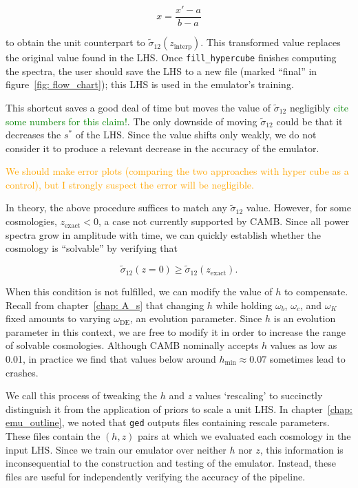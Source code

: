\begin{equation}
x = \frac{x' - a}{b - a}
\end{equation}

to obtain the unit counterpart to $\tilde{\sigma}_{12}(z_\text{interp})$.
This transformed value replaces the original value found in the LHS.
Once \verb|fill_hypercube| finishes computing the spectra, the user
should save the LHS to a new file (marked ``final'' in
figure~\ref{fig: flow_chart}); this LHS is used in the emulator's training.

This shortcut saves a good deal of time but moves the value of
$\tilde{\sigma}_{12}$ negligibly
\textcolor{green}{cite some numbers for this claim!}.
The only downside of moving $\tilde{\sigma}_{12}$ could be that it
decreases the $s^*$ of the LHS. Since the value shifts only weakly, we do not
consider it to produce a relevant decrease in the accuracy of the emulator.

\textcolor{orange}{We should make error plots (comparing the two approaches 
with hyper cube as a control), but I strongly suspect the error will be 
negligible.}

In theory, the above procedure suffices to match any $\tilde{\sigma}_{12}$
value. However, for some cosmologies, $z_\text{exact} < 0$, a case not
currently supported by CAMB. Since all power spectra grow in amplitude with
time, we can quickly establish whether the cosmology is ``solvable'' by
verifying that

\begin{equation}
\label{eq: solvability_cond}
\tilde{\sigma}_{12}(z = 0) \geq \tilde{\sigma}_{12}(z_\text{exact})
.\end{equation}

When this condition is not fulfilled, we can modify the value of $h$ to
compensate. Recall from chapter~\ref{chap: A_s} that changing $h$ while
holding $\omega_b$, $\omega_c$, and $\omega_K$ fixed amounts to varying
$\omega_\text{DE}$, an evolution parameter. Since $h$ is an evolution
parameter in this context, we are free to modify it in order to increase the
range of solvable cosmologies. Although CAMB nominally accepts $h$ values as
low as 0.01, in practice we find that values below around
$h_\text{min} \approx 0.07$ sometimes lead to crashes.

We call this process of tweaking the $h$ and $z$ values `rescaling' to
succinctly distinguish it from the application of priors to scale a unit LHS.
In chapter~\ref{chap: emu_outline}, we noted that \texttt{ged} outputs
files containing rescale parameters. These files contain the $(h, z)$ pairs
at which we evaluated each cosmology in the input LHS. Since we train our
emulator over neither $h$ nor $z$, this information is inconsequential to the
construction and testing of the emulator. Instead, these files are useful for
independently verifying the accuracy of the pipeline.

